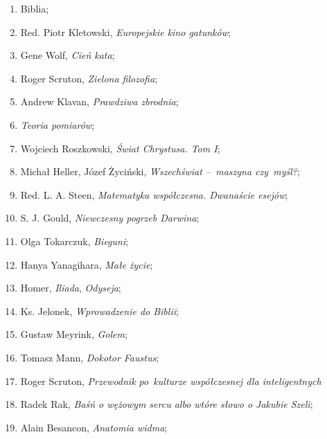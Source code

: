 \documentclass[a4paper,11pt]{article}
\begin{document}
\begin{enumerate}

\item Biblia;

\item Red. Piotr Kletowski, \emph{Europejskie kino gatunków};

\item Gene Wolf, \emph{Cień kata};

\item Roger Scruton, \emph{Zielona filozofia};

\item Andrew Klavan, \emph{Prawdziwa zbrodnia};

\item \emph{Teoria pomiarów};

\item Wojciech Roszkowski, \emph{Świat Chrystusa. Tom I};

\item Michał Heller, Józef Życiński, \emph{Wszechświat --~maszyna
    czy~myśl?};

\item Red. L. A. Steen, \emph{Matematyka współczesna. Dwanaście
    esejów};

\item S. J. Gould, \emph{Niewczesny pogrzeb Darwina};

\item Olga Tokarczuk, \emph{Bieguni};

\item Hanya Yanagihara, \emph{Małe życie};

\item Homer, \emph{Iliada}, \emph{Odyseja};

\item Ks. Jelonek, \emph{Wprowadzenie do Biblii};

\item Gustaw Meyrink, \emph{Golem};

\item Tomasz Mann, \emph{Dokotor Faustus};

\item Roger Scruton, \emph{Przewodnik po~kulturze współczesnej dla
    inteligentnych}

\item Radek Rak, \emph{Baśń o wężowym sercu albo wtóre słowo o Jakubie
    Szeli};

\item Alain Besancon, \emph{Anatomia widma};


\end{enumerate}
\end{document}
